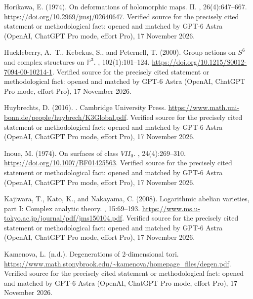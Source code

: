 \begin{thebibliography}{}
Horikawa, E. (1974).
\newblock On deformations of holomorphic maps. {II}.
, 26(4):647--667.
\newblock \url{https://doi.org/10.2969/jmsj/02640647}. Verified source for the precisely cited statement or methodological fact: opened and matched by GPT-6 Astra (OpenAI, ChatGPT Pro mode, effort Pro), 17 November 2026.

Huckleberry, A.~T., Kebekus, S., and Peternell, T. (2000).
\newblock Group actions on {$S^6$} and complex structures on {$\mathbb P^3$}.
, 102(1):101--124.
\newblock \url{https://doi.org/10.1215/S0012-7094-00-10214-1}. Verified source for the precisely cited statement or methodological fact: opened and matched by GPT-6 Astra (OpenAI, ChatGPT Pro mode, effort Pro), 17 November 2026.

Huybrechts, D. (2016).
.
\newblock Cambridge University Press.
\newblock \url{https://www.math.uni-bonn.de/people/huybrech/K3Global.pdf}. Verified source for the precisely cited statement or methodological fact: opened and matched by GPT-6 Astra (OpenAI, ChatGPT Pro mode, effort Pro), 17 November 2026.

Inoue, M. (1974).
\newblock On surfaces of class {$VII_0$}.
, 24(4):269--310.
\newblock \url{https://doi.org/10.1007/BF01425563}. Verified source for the precisely cited statement or methodological fact: opened and matched by GPT-6 Astra (OpenAI, ChatGPT Pro mode, effort Pro), 17 November 2026.

Kajiwara, T., Kato, K., and Nakayama, C. (2008).
\newblock Logarithmic abelian varieties, part {I}: Complex analytic theory.
,
  15:69--193.
\newblock \url{https://www.ms.u-tokyo.ac.jp/journal/pdf/jms150104.pdf}. Verified source for the precisely cited statement or methodological fact: opened and matched by GPT-6 Astra (OpenAI, ChatGPT Pro mode, effort Pro), 17 November 2026.

Kamenova, L. (n.d.).
\newblock Degenerations of 2-dimensional tori.
\newblock \url{https://www.math.stonybrook.edu/~kamenova/homepage_files/degen.pdf}. Verified source for the precisely cited statement or methodological fact: opened and matched by GPT-6 Astra (OpenAI, ChatGPT Pro mode, effort Pro), 17 November 2026.


\end{thebibliography}
